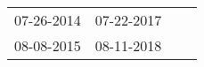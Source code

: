 \begin{supertabular}{llll}
 07-26-2014 &  07-22-2017 \\
 08-08-2015 &  08-11-2018 \\
\end{supertabular}
